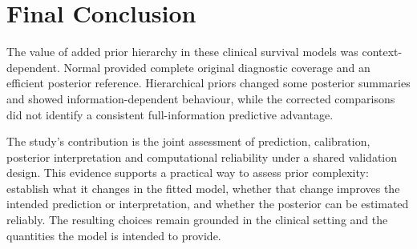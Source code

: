 \section{Final Conclusion}\label{final-conclusion}

The value of added prior hierarchy in these clinical survival models was context-dependent. Normal provided complete original diagnostic coverage and an efficient posterior reference. Hierarchical priors changed some posterior summaries and showed information-dependent behaviour, while the corrected comparisons did not identify a consistent full-information predictive advantage.

The study's contribution is the joint assessment of prediction, calibration, posterior interpretation and computational reliability under a shared validation design. This evidence supports a practical way to assess prior complexity: establish what it changes in the fitted model, whether that change improves the intended prediction or interpretation, and whether the posterior can be estimated reliably. The resulting choices remain grounded in the clinical setting and the quantities the model is intended to provide.
